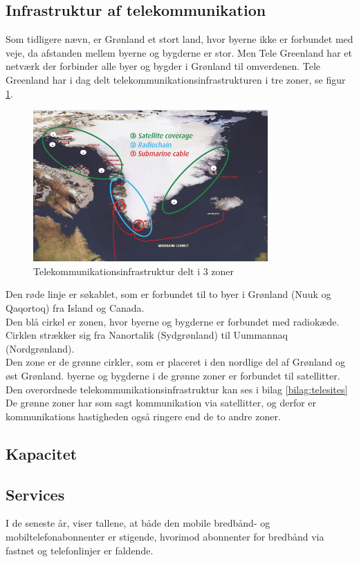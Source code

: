 \subsection{Infrastruktur af telekommunikation}
Som tidligere nævn, er Grønland et stort land, hvor byerne ikke er forbundet med veje, da afstanden mellem byerne og bygderne er stor. Men Tele Greenland har et netværk der forbinder alle byer og bygder i Grønland til omverdenen. Tele Greenland har i dag delt telekommunikationsinfrastrukturen i tre zoner, se figur \ref{fig:zoner}.\\
\begin{figure}[h]
	\centering
	\includegraphics[width=0.8\textwidth]{figure/zoner.PNG}
	\caption{Telekommunikationsinfrastruktur delt i 3 zoner}
	\label{fig:zoner}
\end{figure} 
Den røde linje er søkablet, som er forbundet til to byer i Grønland (Nuuk og Qaqortoq) fra Island og Canada.\\
Den blå cirkel er zonen, hvor byerne og bygderne er forbundet med radiokæde. Cirklen strækker sig fra Nanortalik (Sydgrønland) til Uummannaq (Nordgrønland).\\
Den zone er de grønne cirkler, som er placeret i den nordlige del af Grønland og øst Grønland. byerne og bygderne i de grønne zoner er forbundet til satellitter.\\ 
Den overordnede telekommunikationsinfrastruktur kan ses i bilag \ref{bilag:telesites}\\
De grønne zoner har som sagt kommunikation via satellitter, og derfor er kommunikations hastigheden også ringere end de to andre zoner.

\subsection{Kapacitet}


\subsection{Services}
I de seneste år, viser tallene, at både den mobile bredbånd- og mobiltelefonabonnenter er stigende, hvorimod abonnenter for bredbånd via fastnet og telefonlinjer er faldende.

